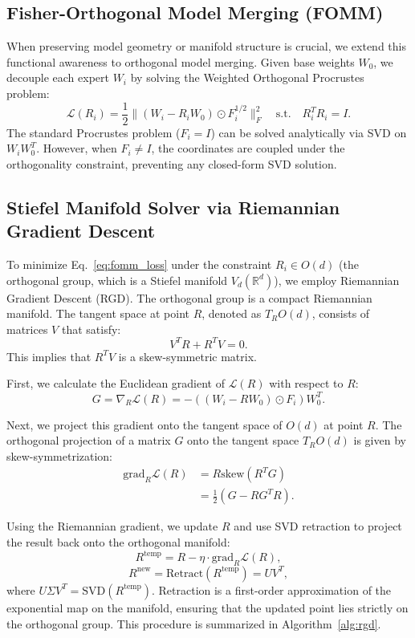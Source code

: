 \documentclass{article}
\theoremstyle{plain}
\theoremstyle{definition}
\theoremstyle{remark}
\begin{document}
\subsection{Fisher-Orthogonal Model Merging (FOMM)}
When preserving model geometry or manifold structure is crucial, we extend this functional awareness to orthogonal model merging. Given base weights $W_0$, we decouple each expert $W_i$ by solving the Weighted Orthogonal Procrustes problem:
\begin{equation}
\label{eq:fomm_loss}
\mathcal{L}(R_i) = \frac{1}{2} \|(W_i - R_i W_0) \odot F_i^{1/2}\|_F^2 \quad \text{s.t.} \quad R_i^T R_i = I.
\end{equation}
The standard Procrustes problem ($F_i = I$) can be solved analytically via SVD on $W_i W_0^T$. However, when $F_i \neq I$, the coordinates are coupled under the orthogonality constraint, preventing any closed-form SVD solution.

\subsection{Stiefel Manifold Solver via Riemannian Gradient Descent}
To minimize Eq.~\eqref{eq:fomm_loss} under the constraint $R_i \in O(d)$ (the orthogonal group, which is a Stiefel manifold $V_d(\mathbb{R}^d)$), we employ Riemannian Gradient Descent (RGD). The orthogonal group is a compact Riemannian manifold. The tangent space at point $R$, denoted as $T_R O(d)$, consists of matrices $V$ that satisfy:
\begin{equation}
V^T R + R^T V = 0.
\end{equation}
This implies that $R^T V$ is a skew-symmetric matrix.

First, we calculate the Euclidean gradient of $\mathcal{L}(R)$ with respect to $R$:
\begin{equation}
G = \nabla_R \mathcal{L}(R) = - ((W_i - R W_0) \odot F_i) W_0^T.
\end{equation}

Next, we project this gradient onto the tangent space of $O(d)$ at point $R$. The orthogonal projection of a matrix $G$ onto the tangent space $T_R O(d)$ is given by skew-symmetrization:
\begin{align}
\text{grad}_R \mathcal{L}(R) &= R \text{skew}(R^T G) \nonumber \\
&= \frac{1}{2} (G - R G^T R).
\end{align}

Using the Riemannian gradient, we update $R$ and use SVD retraction to project the result back onto the orthogonal manifold:
\begin{equation}
R^{\text{temp}} = R - \eta \cdot \text{grad}_R \mathcal{L}(R),
\end{equation}
\begin{equation}
R^{\text{new}} = \text{Retract}(R^{\text{temp}}) = U V^T,
\end{equation}
where $U \Sigma V^T = \text{SVD}(R^{\text{temp}})$. Retraction is a first-order approximation of the exponential map on the manifold, ensuring that the updated point lies strictly on the orthogonal group. This procedure is summarized in Algorithm~\ref{alg:rgd}.
\end{document}
